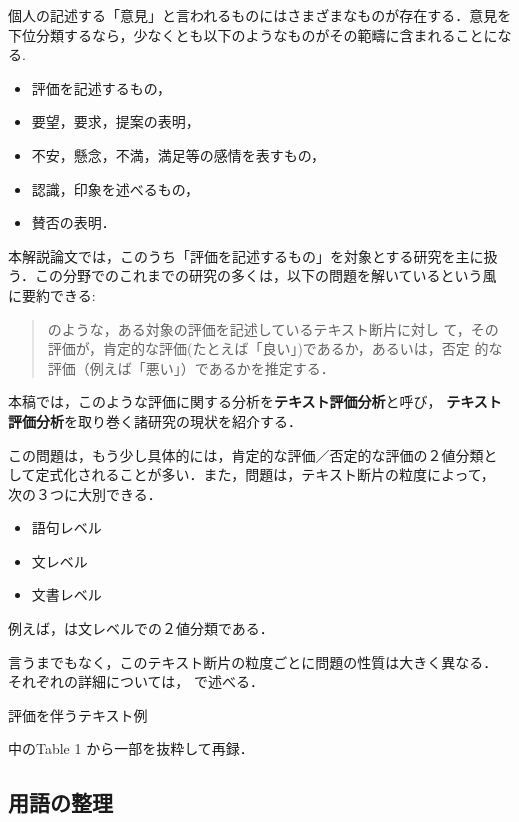 個人の記述する「意見」と言われるものにはさまざまなものが存在する．意見を
下位分類するなら，少なくとも以下のようなものがその範疇に含まれることにな
る.
\begin{itemize}
\item 評価を記述するもの，

\item 要望，要求，提案の表明，

\item 不安，懸念，不満，満足等の感情を表すもの，

\item 認識，印象を述べるもの，

\item 賛否の表明．
\end{itemize}

本解説論文では，このうち「評価を記述するもの」を対象とする研究を主に扱
う．この分野でのこれまでの研究の多くは，以下の問題を解いているという風
に要約できる:
\begin{quote}
のような，ある対象の評価を記述しているテキスト断片に対し
て，その評価が，肯定的な評価(たとえば「良い」)であるか，あるいは，否定
的な評価（例えば「悪い」）であるかを推定する．
\end{quote}
本稿では，このような評価に関する分析を{\bf テキスト評価分析}と呼び，
{\bf テキスト評価分析}を取り巻く諸研究の現状を紹介する．

この問題は，もう少し具体的には，肯定的な評価／否定的な評価の２値分類と
して定式化されることが多い．また，問題は，テキスト断片の粒度によって，
次の３つに大別できる．
\begin{itemize}
 \item 語句レベル
 \item 文レベル
 \item 文書レベル
\end{itemize}
例えば，は文レベルでの２値分類である．

言うまでもなく，このテキスト断片の粒度ごとに問題の性質は大きく異なる．
それぞれの詳細については， で述べる．

\begin{table}[t]
 \begin{center}
 \caption{評価を伴うテキスト例} \label{tab:example1}
\cite{morinaga2002a} 中のTable 1 から一部を抜粋して再録．
     
 \end{center}
\end{table}

\subsection{用語の整理}

